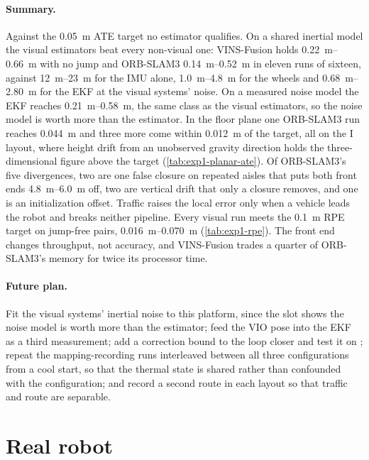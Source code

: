 \documentclass[11pt,a4paper,notitlepage]{report}
\begin{document}
\paragraph{Summary.} Against the \SI{0.05}{\metre} ATE target no estimator
qualifies. On a shared inertial model the visual estimators beat every
non-visual one: VINS-Fusion holds \SIrange{0.22}{0.66}{\metre} with no jump
and ORB-SLAM3 \SIrange{0.14}{0.52}{\metre} in eleven runs of sixteen, against
\SIrange{12}{23}{\metre} for the IMU alone, \SIrange{1.0}{4.8}{\metre} for the
wheels and \SIrange{0.68}{2.80}{\metre} for the EKF at the visual systems'
noise. On a measured noise model the EKF reaches \SIrange{0.21}{0.58}{\metre},
the same class as the visual estimators, so the noise model is worth more than
the estimator. In the floor plane one ORB-SLAM3 run
reaches \SI{0.044}{\metre} and three more come within \SI{0.012}{\metre} of
the target, all on the I layout, where height drift from an unobserved gravity
direction holds the three-dimensional figure above the target
(\cref{tab:exp1-planar-ate}). Of ORB-SLAM3's five divergences, two are one false
closure on repeated aisles that puts both front ends
\SIrange{4.8}{6.0}{\metre} off, two are vertical drift that only a closure
removes, and one is an initialization offset. Traffic raises the local error only when a vehicle leads the robot and
breaks neither pipeline. Every visual run meets the \SI{0.1}{\metre} RPE
target on jump-free pairs, \SIrange{0.016}{0.070}{\metre}
(\cref{tab:exp1-rpe}). The front end changes throughput, not accuracy, and
VINS-Fusion trades a quarter of ORB-SLAM3's memory for twice its processor
time.

\paragraph{Future plan.} Fit the visual systems' inertial noise to this
platform, since the slot shows the noise model is
worth more than the estimator; feed the VIO pose into the EKF as a third
measurement; add a correction bound to the loop closer and test it on
; repeat the mapping-recording runs interleaved between
all three configurations from a cool start, so that the thermal state is
shared rather than confounded with the configuration; and record a second
route in each layout so that traffic and route are separable.

\FloatBarrier

\section{Real robot}
\label{sec:exp1-real}
\end{document}
